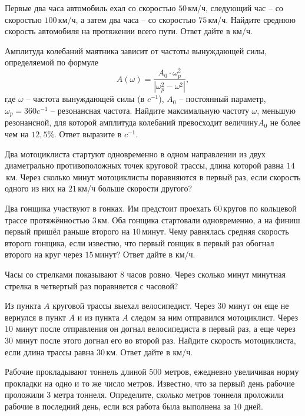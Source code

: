 \begin{class}[number=4]
	\begin{listofex}
		\item Первые два часа автомобиль ехал со скоростью \( 50 \) км/ч, следующий час -- со скоростью \( 100 \) км/ч, а затем два часа -- со скоростью \( 75 \) км/ч. Найдите среднюю скорость автомобиля на протяжении всего пути. Ответ дайте в км/ч.
		\item 	Амплитуда колебаний маятника зависит от частоты вынуждающей силы, определяемой по формуле
		\[ A(\omega)=\dfrac{A_0\cdot\omega _p ^2}{|\omega _p ^2-\omega^2|}, \]
		где \( \omega \) – частота вынуждающей силы (в \( c^{-1} \)), \( A_0 \) – постоянный параметр, \( \omega_p = 360c^{-1}\) – резонансная частота. Найдите максимальную частоту \( \omega  \), меньшую резонансной, для которой амплитуда колебаний превосходит величину\(  A_0  \) не более чем на \( 12,5\% \). Ответ выразите в \( c^{-1} \).
		\item Два мотоциклиста стартуют одновременно в одном направлении из двух диаметрально противоположных точек круговой трассы, длина которой равна \( 14 \) км. Через сколько минут мотоциклисты поравняются в первый раз, если скорость одного из них на \( 21 \) км/ч больше скорости другого?
		\item Два гонщика участвуют в гонках. Им предстоит проехать \( 60 \) кругов по кольцевой трассе протяжённостью \( 3 \) км. Оба гонщика стартовали одновременно, а на финиш первый пришёл раньше второго на \( 10 \) минут. Чему равнялась средняя скорость второго гонщика, если известно, что первый гонщик в первый раз обогнал второго на круг через \( 15 \) минут? Ответ дайте в км/ч.
		\item Часы со стрелками показывают \( 8 \) часов ровно. Через сколько минут минутная стрелка в четвертый раз поравняется с часовой?
		\item Из пункта \( A \) круговой трассы выехал велосипедист. Через \( 30 \) минут он еще не вернулся в пункт \( A \) и из пункта \( A \) следом за ним отправился мотоциклист. Через \( 10 \) минут после отправления он догнал велосипедиста в первый раз, а еще через \( 30 \) минут после этого догнал его во второй раз. Найдите скорость мотоциклиста, если длина трассы равна \( 30 \) км. Ответ дайте в км/ч.
		\item Рабочие прокладывают тоннель длиной \( 500 \) метров, ежедневно увеличивая норму прокладки на одно и то же число метров. Известно, что за первый день рабочие проложили \( 3 \) метра тоннеля. Определите, сколько метров тоннеля проложили рабочие в последний день, если вся работа была выполнена за \( 10 \) дней.

\end{listofex}
\end{class}
